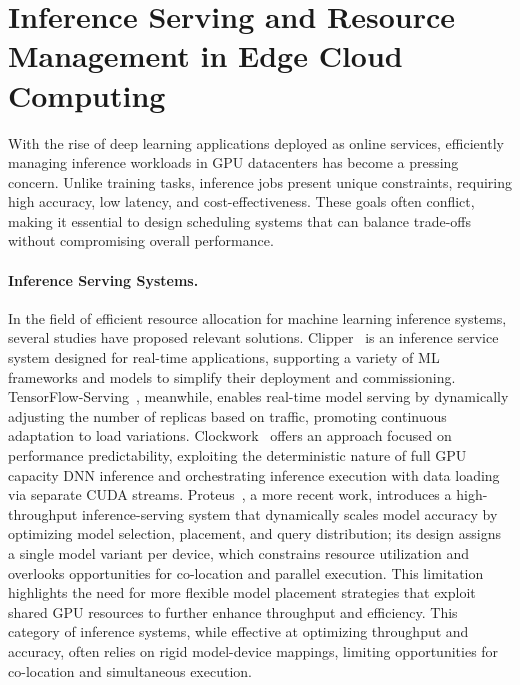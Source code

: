\section{Inference Serving and Resource Management in Edge Cloud Computing}\label{sec:inference_serving_and_resource_management_in_edge_cloud_computing}

With the rise of deep learning applications deployed as online services, efficiently managing inference workloads in GPU datacenters has become a pressing concern. Unlike training tasks, inference jobs present unique constraints, requiring high accuracy, low latency, and cost-effectiveness. These goals often conflict, making it essential to design scheduling systems that can balance trade-offs without compromising overall performance.

\paragraph{Inference Serving Systems.}
In the field of efficient resource allocation for machine learning inference systems, several studies have proposed relevant solutions. Clipper~\cite{2017clipper} is an inference service system designed for real-time applications, supporting a variety of ML frameworks and models to simplify their deployment and commissioning. TensorFlow-Serving~\cite{olston2017tensorflowserving}, meanwhile, enables real-time model serving by dynamically adjusting the number of replicas based on traffic, promoting continuous adaptation to load variations. Clockwork~\cite{gujarati2020servingdnnslikeclockwork} offers an approach focused on performance predictability, exploiting the deterministic nature of full GPU capacity DNN inference and orchestrating inference execution with data loading via separate CUDA streams. Proteus~\cite{ahmad2024proteus}, a more recent work, introduces a high-throughput inference-serving system that dynamically scales model accuracy by optimizing model selection, placement, and query distribution; its design assigns a single model variant per device, which constrains resource utilization and overlooks opportunities for co-location and parallel execution. This limitation highlights the need for more flexible model placement strategies that exploit shared GPU resources to further enhance throughput and efficiency. This category of inference systems, while effective at optimizing throughput and accuracy, often relies on rigid model-device mappings, limiting opportunities for co-location and simultaneous execution.

